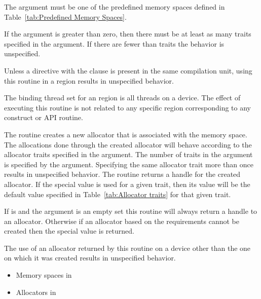 \constraints

The  argument must be one of the predefined memory spaces defined in Table~\ref{tab:Predefined Memory Spaces}.

If the  argument is greater than zero, then there must be at least as many traits
specified in the  argument. If there are fewer than  traits the behavior is
unspecified.

Unless a  directive with the  clause is present in the same compilation unit, using this routine in a  region results in unspecified behavior.

\binding

The binding thread set for an  region is all threads on a device.
The effect of executing this routine is not related to any specific region corresponding to any construct or API routine.

\effect

The  routine creates a new allocator that is associated with the  memory space. 
The allocations done through the created allocator will behave according to the allocator traits specified in the  argument.  The number of traits in the  argument is specified by the  argument. Specifying the same allocator trait more than once results in unspecified behavior. The routine returns a handle for the created allocator. If the special  value is used for a given trait, then its value will be the default value specified in Table~\ref{tab:Allocator traits} for that given trait.

If  is  and the  argument is an empty set this routine will always return a handle to an allocator. Otherwise if an allocator based on the requirements cannot be created then the special value  is returned.

The use of an allocator returned by this routine on a device other than the one on which it was created results in unspecified behavior.

\crossreferences
\begin{itemize}
\item Memory spaces in 
\item Allocators in 
\end{itemize}

